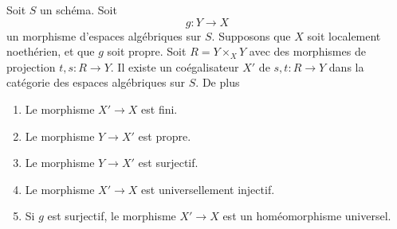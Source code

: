 \begin{lemma}
\label{lemma-coequalizer}
Soit $S$ un schéma. Soit
$$
g : Y \longrightarrow X
$$
un morphisme d'espaces algébriques sur $S$. Supposons que $X$ soit localement noethérien,
et que $g$ soit propre. Soit $R = Y \times_X Y$ avec des morphismes de projection
$t, s : R \to Y$. Il existe un coégalisateur $X'$ de $s, t : R \to Y$
dans la catégorie des espaces algébriques sur $S$. De plus
\begin{enumerate}
\item Le morphisme $X' \to X$ est fini.
\item Le morphisme $Y \to X'$ est propre.
\item Le morphisme $Y \to X'$ est surjectif.
\item Le morphisme $X' \to X$ est universellement injectif.
\item Si $g$ est surjectif, le morphisme $X' \to X$
est un homéomorphisme universel.
\end{enumerate}
\end{lemma}

